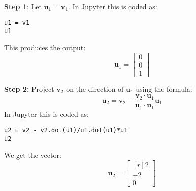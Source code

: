 \documentclass[12pt]{article}
\begin{document}
\textbf{Step 1}: Let $\mathbf{u}_1=\mathbf{v}_1$. In Jupyter this is coded as:
\begin{lstlisting}
u1 = v1
u1
\end{lstlisting}
This produces the output:
\[
\mathbf{u}_1=\begin{bmatrix}0\\0\\1\end{bmatrix}
\]

\textbf{Step 2:} Project $\mathbf{v}_2$ on the direction of $\mathbf{u}_1$ using the formula:
\[
\mathbf{u}_2 = \mathbf{v}_2-\frac{\mathbf{v}_2\cdot\mathbf{u}_1}{\mathbf{u}_1\cdot\mathbf{u}_1}\mathbf{u}_1
\]
In Jupyter this is coded as:
\begin{lstlisting}
u2 = v2 - v2.dot(u1)/u1.dot(u1)*u1
u2
\end{lstlisting}
We get the vector:
\[
\mathbf{u}_2=\left[\begin{matrix*}[r]2\\-2\\0\end{matrix*}\right]
\]
\end{document}
